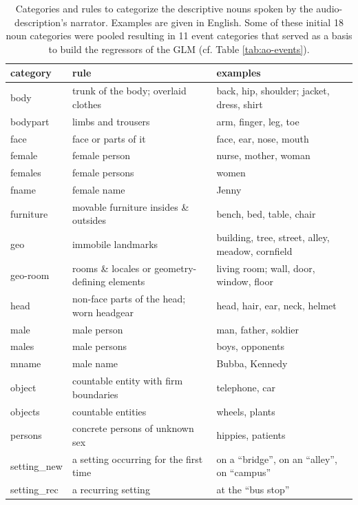 \documentclass[english]{article}
\begin{document}
\begin{table}[h!]
    \caption{Categories and rules to categorize the descriptive nouns spoken by
        the audio-description's narrator.
        Examples are given in English.
        Some of these initial 18 noun categories were pooled resulting in 11
        event categories that served as a basis to build the regressors of the
        GLM
        (cf. Table \ref{tab:ao-events}).
}
\label{tab:descr-nouns-rules}
\begin{tabular}{lll}
\toprule
\textbf{category} & \textbf{rule} & \textbf{examples} \\
\midrule
body & trunk of the body; overlaid clothes & back, hip, shoulder; jacket, dress, shirt
\tabularnewline
bodypart & limbs and trousers & arm, finger, leg, toe
\tabularnewline
face & face or parts of it & face, ear, nose, mouth
\tabularnewline
female & female person & nurse, mother, woman
\tabularnewline
females & female persons & women
\tabularnewline
fname & female name & Jenny
\tabularnewline
furniture & movable furniture insides \& outsides & bench, bed, table, chair
\tabularnewline
geo & immobile landmarks & building, tree, street, alley, meadow, cornfield \tabularnewline
geo-room & rooms \& locales or geometry-defining elements & living room; wall, door, window, floor
\tabularnewline
head & non-face parts of the head; worn headgear & head, hair, ear, neck,
helmet
\tabularnewline
male & male person & man, father, soldier
\tabularnewline
males & male persons & boys, opponents
\tabularnewline
mname & male name & Bubba, Kennedy
\tabularnewline
object & countable entity with firm boundaries & telephone, car
\tabularnewline
objects & countable entities & wheels, plants
\tabularnewline
persons & concrete persons of unknown sex & hippies, patients
\tabularnewline
setting\_new & a setting occurring for the first time & on a ``bridge'', on an ``alley'', on ``campus''
\tabularnewline
setting\_rec & a recurring setting & at the ``bus stop'' \tabularnewline
\bottomrule
\end{tabular}
\end{table}
\end{document}
